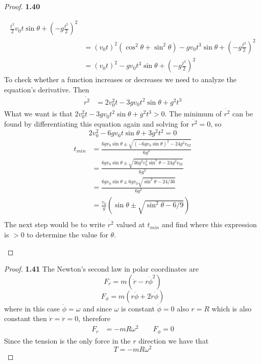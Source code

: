 \documentclass[11pt]{article}
\begin{document}
\begin{proof}{\textbf{1.40}}
\begin{itemize}
\begin{align*}
                    \frac{t^2}{2} v_0 t\sin{\theta} + \left(-g \frac{t^2}{2}\right)^2 \\
                    &= (v_0t)^2(\cos^2{\theta} + \sin^2{\theta}) - g v_0 t^3
                    \sin{\theta} + \left(-g \frac{t^2}{2}\right)^2 \\
                    &= (v_0t)^2 - g v_0t^3 \sin{\theta} +
                    \left(-g \frac{t^2}{2}\right)^2
            \end{align*}
            To check whether a function increases or decreases we need to
            analyze the equation's derivative. Then
            \begin{align*}
                \dot{r^2} &= 2 v_0^2 t - 3g v_0 t^2 \sin{\theta} + g^2 t^3 
            \end{align*}
            What we want is that $2 v_0^2t - 3g v_0 t^2 \sin{\theta} + g^2 t^3 > 0$.
            The minimum of $\dot{r^2}$ can be found by differentiating this
            equation again and solving for $\ddot{r^2} = 0$, so
            $$2v_0^2 - 6gv_0t\sin{\theta} + 3g^2t^2 = 0$$
            \begin{align*}
                t_{min} &= \frac{6gv_0\sin{\theta} \pm \sqrt{(-6gv_0 \sin{\theta})^2
                        - 24g^2v_02}}{6g^2} \\
                        &= \frac{6gv_0\sin{\theta} \pm \sqrt{36g^2v_0^2 \sin^2{\theta}
                        - 24g^2v_02}}{6g^2} \\
                        &= \frac{6gv_0\sin{\theta} \pm 6gv_0\sqrt{\sin^2{\theta}
                        - 24/36}}{6g^2} \\
                        &= \frac{v_0}{g}(\sin{\theta} \pm \sqrt{\sin^2{\theta}
                        - 6/9}) \\
                \end{align*}
            The next step would be to write $\dot{r^2}$ valued at $t_{min}$ and
            find where this expression is $>0$ to determine the value for
            $\theta$.            
        \end{itemize}
    \end{proof}
    \begin{proof}{\textbf{1.41}}
        The Newton's second law in polar coordinates are
        $$F_r = m(\ddot{r} - r \dot{\phi}^2)$$
        $$F_{\phi} = m(r \ddot{\phi} + 2\dot{r}\dot{\phi})$$
        where in this case $\dot{\phi} = \omega$ and since $\omega$ is
        constant $\ddot{\phi} = 0$ also $r=R$ which is also constant then
        $\dot{r} = \ddot{r} = 0$, therefore
        \begin{align*}
            F_r &= -mR\omega^2 \quad\quad F_{\phi} = 0
        \end{align*}
        Since the tension is the only force in the $r$ direction we have
        that
        $$T = -mR\omega^2$$
    \end{proof}
\end{document}
